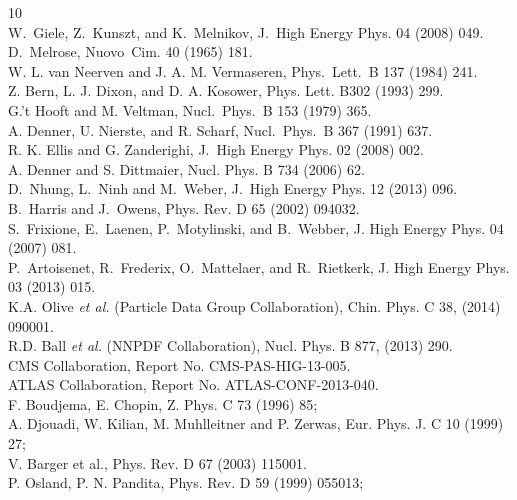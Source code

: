 \begin{thebibliography}{10}
\\
W.~Giele, Z.~Kunszt, and K.~Melnikov, J.~High Energy Phys. 04 (2008) 049.
\\
D.~Melrose, Nuovo~Cim. 40 (1965) 181.
\\
W. L. van Neerven and J. A. M. Vermaseren, Phys.~Lett.~B 137 (1984) 241.
\\
Z. Bern, L. J. Dixon, and D. A. Kosower, Phys. Lett. B302 (1993) 299.
\\
G.'t Hooft and M. Veltman, Nucl.~Phys.~B 153 (1979) 365.
\\
A. Denner, U. Nierste, and R. Scharf, Nucl.~Phys.~B 367 (1991) 637.
\\
R. K. Ellis and G. Zanderighi,  J.~High Energy Phys. 02 (2008) 002.
\\
A. Denner and S. Dittmaier, Nucl. Phys. B 734 (2006) 62.
\\
D.~Nhung, L.~Ninh and M.~Weber, J.~High Energy Phys. 12 (2013) 096.
\\
B.~Harris and J.~Owens, Phys. Rev. D 65 (2002) 094032.
\\
S.~Frixione, E.~Laenen, P.~Motylinski, and B.~Webber, J. High Energy Phys. 04 (2007) 081.
\\
P.~Artoisenet, R.~Frederix, O.~Mattelaer, and R.~Rietkerk, J. High Energy Phys. 03 (2013) 015.
\\
K.A. Olive {\it et al.} (Particle Data Group Collaboration), Chin. Phys. C 38, (2014) 090001.
\\
R.D. Ball {\it et al.} (NNPDF Collaboration), Nucl. Phys. B 877, (2013) 290.
\\
    CMS Collaboration, Report No. CMS-PAS-HIG-13-005.
\\
    ATLAS Collaboration, Report No. ATLAS-CONF-2013-040.
\\
F. Boudjema, E. Chopin, Z. Phys. C 73 (1996) 85; \\
A. Djouadi, W. Kilian, M. Muhlleitner and P. Zerwas, Eur. Phys. J. C 10 (1999) 27;\\
V. Barger et al., Phys. Rev. D 67 (2003) 115001.
\\
P. Osland, P. N. Pandita, Phys. Rev. D 59 (1999) 055013;\\

\end{thebibliography}
